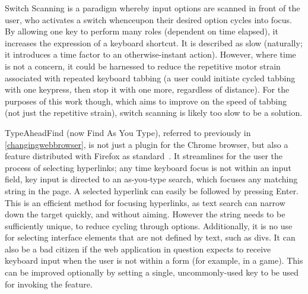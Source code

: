 \documentclass[a4paper, 11pt]{article}
\begin{document}
Switch Scanning is a paradigm whereby input options are scanned in front of the user, who activates a switch whenceupon their desired option cycles into focus\cite{hendrix1997adapting}. By allowing one key to perform many roles (dependent on time elapsed), it increases the expression of a keyboard shortcut. It is described as slow (naturally; it introduces a time factor to an otherwise-instant action). However, where time is not a concern, it could be harnessed to reduce the repetitive motor strain associated with repeated keyboard tabbing (a user could initiate cycled tabbing with one keypress, then stop it with one more, regardless of distance). For the purposes of this work though, which aims to improve on the speed of tabbing (not just the repetitive strain), switch scanning is likely too slow to be a solution.

TypeAheadFind (now Find As You Type), referred to previously in \cref{changingwebbrowser}, is not just a plugin for the Chrome browser, but also a feature distributed with Firefox as standard~\cite{firefoxshortcuts}. It streamlines for the user the process of selecting hyperlinks; any time keyboard focus is not within an input field, key input is directed to an as-you-type search, which focuses any matching string in the page. A selected hyperlink can easily be followed by pressing Enter. This is an efficient method for focusing hyperlinks, as text search can narrow down the target quickly, and without aiming. However the string needs to be sufficiently unique, to reduce cycling through options. Additionally, it is no use for selecting interface elements that are not defined by text, such as divs. It can also be a bad citizen if the web application in question expects to receive keyboard input when the user is not within a form (for example, in a game). This can be improved optionally by setting a single, uncommonly-used key to be used for invoking the feature.
\end{document}
